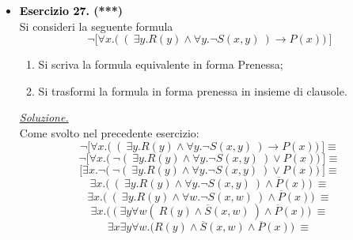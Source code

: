 \documentclass[a4paper,10pt]{article}
\begin{document}
{\begin{itemize}[label=, leftmargin=0pt]
\begin{osservazioni}
    Si osserva come la scelta della costante da associare a $x$ e $y$ dipende \textbf{dalla scelta di $w$} che abbiamo proposto. Se così, poiché si tratta di una costante in funzione della scelta di $w$... possiamo sostituire i termini con \textit{termini funzionali su $w$}, preservando coerenza:
    $$\forall w \forall t\exists z.\bigg(\phi_1(f_1(w),f_2(w)) \land \phi_2(w,t,z)\bigg)$$
    Lo stesso varrebbe anche per z, se solo non vi fosse la dipendenza anche dalla scelta di $t$: per lui introduciamo un funzionale a due input.
    $$\forall w \forall t\exists z.\bigg(\phi_1(f_1(w),f_2(w)) \land \phi_2(w,t,f_3(w,t))\bigg)$$
    Allora, la formula diventerà: 

    $$\forall w \forall t\exists z.\bigg( \ ( \overline P(f_1(w))\lor\ Q(f_2(w)))\land (\overline P(f_1(w))\lor \overline R(f_1(w),f_2(w))\ ) \land (\ \overline S(w,t)\lor P(f_3(w,t))\lor P(w) \ ) \bigg)$$

    E liberandoci dei quantificatori universali, ricostruiamo l'insieme di clausole:
    $$\{\overline P(f_1(w)),\ Q(f_2(w))\},\ \{\overline P(f_1(w)), \overline R(f_1(w),f_2(w))\ \},\ \{\overline S(w,t), P(f_3(w,t)), P(w)\}$$
    \end{osservazioni}

    
    \item \textbf{\textcolor{black}{Esercizio 27.} (***)} \\ 
    Si consideri la seguente formula 
    $$\lnot \bigg[\forall x.\bigg(\ (\  \exists y.R(y)\land \forall y.\lnot S(x,y)\ )\rightarrow P(x)\bigg)\ \bigg]$$
    \begin{enumerate}
        \item Si scriva la formula equivalente in forma Prenessa;
        \item Si trasformi la formula in forma prenessa in insieme di clausole.\\[0.1cm]
    \end{enumerate}

    \begin{osservazioni}
    \underline{\textit{Soluzione.}}\\
    Come svolto nel precedente esercizio:
    $$\lnot \bigg[\forall x.\bigg(\ (\  \exists y.R(y)\land \forall y.\lnot S(x,y)\ )\rightarrow P(x)\bigg)\ \bigg]\equiv$$
    $$\lnot \bigg[\forall x.\bigg(\ \lnot(\  \exists y.R(y)\land \forall y.\lnot S(x,y)\ )\lor P(x)\bigg)\ \bigg]\equiv$$
    $$ \bigg[\exists x.\lnot\bigg(\ \lnot(\  \exists y.R(y)\land \forall y.\lnot S(x,y)\ )\lor P(x)\bigg)\ \bigg]\equiv$$
    $$ \exists x.\bigg(\ (\  \exists y.R(y)\land \forall y.\lnot S(x,y)\ )\land \overline P(x)\bigg)\ \equiv$$
    $$ \exists x.\bigg(\ (\  \exists y.R(y)\land \forall w.\lnot S(x,w)\ )\land \overline P(x)\bigg)\ \equiv$$
    $$ \exists x.\bigg(\ (\  \exists y\forall w (\ R(y)\land \overline S(x,w)\ )\land \overline P(x)\bigg)\ \equiv$$
    $$ \exists x\exists y\forall w.\bigg( R(y)\land \overline S(x,w) \land \overline P(x)\bigg)\ \equiv$$


\end{osservazioni}
\end{itemize}}
\end{document}
